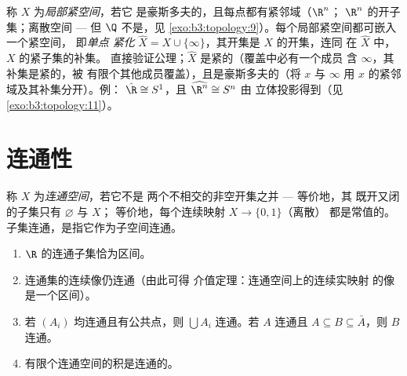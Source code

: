 \begin{definition}\label{def:b3:topology:locallycompact}
称 $X$ 为\emph{局部紧空间}，若它
是豪斯多夫的，且每点都有紧邻域（$\R^n$；
$\R^n$ 的开子集；离散空间 --- 但 $\Q$ 不是，见
\cref{exo:b3:topology:9}）。每个局部紧空间都可嵌入一个紧空间，
即\emph{单点
紧化} $\hat X = X
\cup \{\infty\}$，其开集是 $X$ 的开集，连同
在 $\hat X$ 中，$X$ 的紧子集的补集。
直接验证公理；$\hat X$ 是紧的（覆盖中必有一个成员
含 $\infty$，其补集是紧的，被
有限个其他成员覆盖），且是豪斯多夫的（将 $x$ 与 $\infty$
用 $x$ 的紧邻域及其补集分开）。例：
$\hat\R \cong S^1$，且 $\widehat{\R^n} \cong S^n$ 由
立体投影得到（见\cref{exo:b3:topology:11}）。
\end{definition}

\section{连通性}

\begin{definition}\label{def:b3:topology:connected}
称 $X$ 为\emph{连通空间}，若它不是
两个不相交的非空开集之并 --- 等价地，其
既开又闭的子集只有 $\varnothing$ 与 $X$；
等价地，每个连续映射 $X \to \{0, 1\}$（离散）
都是常值的。子集连通，是指它作为子空间连通。
\end{definition}

\begin{theorem}\label{thm:b3:topology:connectedbasics}
\begin{enumerate}
  \item $\R$ 的连通子集恰为区间。
  \item 连通集的连续像仍连通（由此可得
        介值定理：连通空间上的连续实映射
        的像是一个区间）。
  \item 若 $(A_i)$ 均连通且有公共点，则 $\bigcup
        A_i$ 连通。若 $A$ 连通且 $A \subseteq
        B \subseteq \bar A$，则 $B$ 连通。
  \item 有限个连通空间的积是连通的。
\end{enumerate}
\end{theorem}

